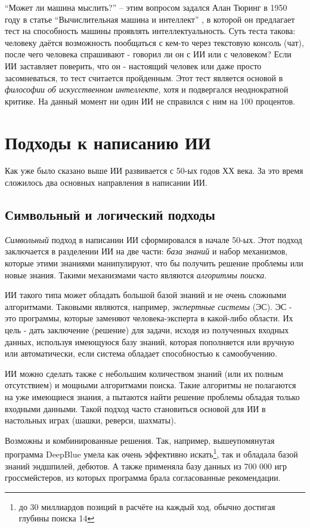 \documentclass[12pt]{report}
\begin{document}
``Может ли машина мыслить?'' -- этим вопросом задался Алан Тюринг в 1950 году в статье ``Вычислительная машина и интеллект'' \citep{alan1950}, в которой он предлагает тест на способность машины проявлять интеллектуальность. Суть теста такова: человеку даётся возможность пообщаться с кем-то через текстовую консоль (чат), после чего человека спрашивают - говорил ли он с ИИ или с человеком? Если ИИ заставляет поверить, что он - настоящий человек или даже просто засомневаться, то тест считается пройденным. Этот тест является основой в \emph{философии об искусственном интеллекте}, хотя и подвергался неоднократной критике. \citep{searle1980} На данный момент ни один ИИ не справился с ним на 100 процентов.


\section{Подходы к написанию ИИ}
Как уже было сказано выше ИИ развивается с 50-ых годов ХХ века. За это время сложилось два основных направления в написании ИИ.


\subsection{Символьный и логический подходы}
\emph{Символьный} подход в написании ИИ сформировался в начале 50-ых. Этот подход заключается в разделении ИИ на две части: \emph{база знаний} и набор механизмов, которые этими знаниями манипулируют, что бы получить решение проблемы или новые знания. Такими механизмами часто являются \emph{алгоритмы поиска}.

ИИ такого типа может обладать большой базой знаний и не очень сложными алгоритмами. Таковыми являются, например, \emph{экспертные системы} (ЭС). ЭС - это программы, которые заменяют человека-эксперта в какой-либо области. Их цель - дать заключение (решение) для задачи, исходя из полученных входных данных, используя имеющуюся базу знаний, которая пополняется или вручную или автоматически, если система обладает способностью к самообучению.


ИИ можно сделать также с небольшим количеством знаний (или их полным отсутствием) и мощными алгоритмами поиска. Такие алгоритмы не полагаются на уже имеющиеся знания, а пытаются найти решение проблемы обладая только входными данными. Такой подход часто становиться основой для ИИ в настольных играх (шашки, реверси, шахматы).

Возможны и комбинированные решения. Так, например, вышеупомянутая программа DeepBlue умела как очень эффективно искать\footnote{до 30 миллиардов позиций в расчёте на каждый ход, обычно достигая глубины поиска 14}, так и обладала базой знаний эндшпилей, дебютов. А также применяла базу данных из 700 000 игр гроссмейстеров, из которых программа брала согласованные рекомендации. \citep{russell1995}
\end{document}
